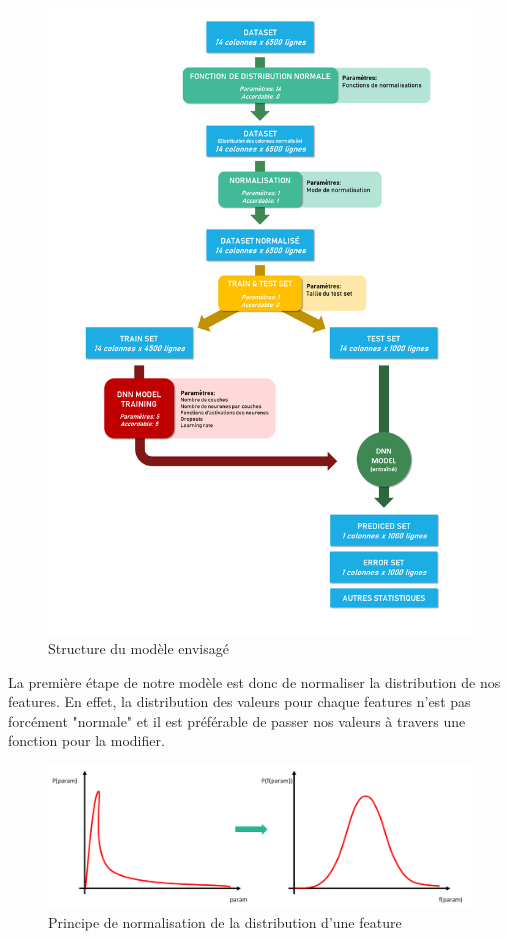 \begin{figure}[H]
    \centering
    \includegraphics[width=\linewidth]{images/graphs/struc_model_dnn.png}
    \captionsetup{justification=centering}
    \caption{Structure du modèle envisagé}
    \label{fig:strcu_dnn}
\end{figure}

La première étape de notre modèle est donc de normaliser la distribution de nos features. En effet, la distribution des valeurs pour chaque features n'est pas forcément "normale" et il est préférable de passer nos valeurs à travers une fonction pour la modifier.

\begin{figure}[H]
    \centering
    \includegraphics[width=\linewidth]{images/graphs/fct_histo.png}
    \captionsetup{justification=centering}
    \caption{Principe de normalisation de la distribution d'une feature}
    \label{fig:fct_repartition}
\end{figure}

